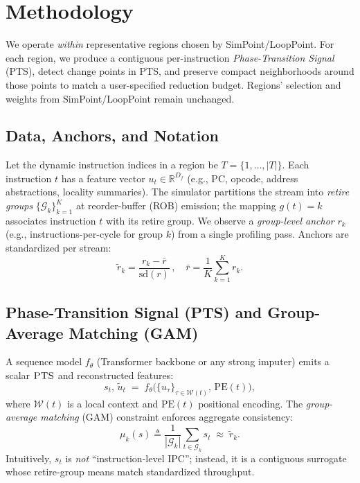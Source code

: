 \documentclass[10pt,journal,compsoc]{IEEEtran}
\newcommand{\pts}{\textsc{PTS}}
\newcommand{\gam}{\textsc{GAM}}
\begin{document}
\section{Methodology}
\label{sec:methodology}
We operate \emph{within} representative regions chosen by SimPoint/LoopPoint. For each region, we produce a contiguous per-instruction \emph{Phase-Transition Signal} (\pts), detect change points in \pts, and preserve compact neighborhoods around those points to match a user-specified reduction budget. Regions’ selection and weights from SimPoint/LoopPoint remain unchanged.
\subsection{Data, Anchors, and Notation}
Let the dynamic instruction indices in a region be \(T=\{1,\ldots,|T|\}\). Each instruction \(t\) has a feature vector \(u_t\in\mathbb{R}^{D_f}\) (e.g., PC, opcode, address abstractions, locality summaries). The simulator partitions the stream into \emph{retire groups} \(\{\mathcal{G}_k\}_{k=1}^K\) at reorder-buffer (ROB) emission; the mapping \(g(t)=k\) associates instruction \(t\) with its retire group. We observe a \emph{group-level anchor} \(r_k\) (e.g., instructions-per-cycle for group \(k\)) from a single profiling pass. Anchors are standardized per stream:
\[
\tilde{r}_k=\frac{r_k-\bar{r}}{\mathrm{sd}(r)}\,,\quad \bar{r}=\frac{1}{K}\sum_{k=1}^K r_k.
\]
\subsection{Phase-Transition Signal (\pts) and Group-Average Matching (\gam)}
A sequence model \(f_\theta\) (Transformer backbone or any strong imputer) emits a scalar \(\pts\) and reconstructed features:
\[
s_t,\,\tilde{u}_t \;=\; f_\theta\!\big(\{u_\tau\}_{\tau\in\mathcal{W}(t)},\,\mathrm{PE}(t)\big),
\]
where \(\mathcal{W}(t)\) is a local context and \(\mathrm{PE}(t)\) positional encoding. The \emph{group-average matching} (\gam) constraint enforces aggregate consistency:
\begin{equation}
\mu_k(s)\triangleq\frac{1}{|\mathcal{G}_k|}\sum_{t\in\mathcal{G}_k}s_t\;\approx\;\tilde{r}_k.
\label{eq:group-avg}
\end{equation}
Intuitively, \(s_t\) is \emph{not} “instruction-level IPC”; instead, it is a contiguous surrogate whose retire-group means match standardized throughput.
\end{document}
